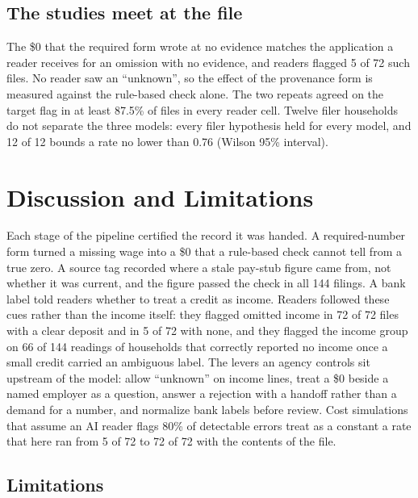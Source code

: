 \documentclass[sigconf,nonacm,screen]{acmart}
\begin{document}
\subsection{The studies meet at the file}
\label{sec:results-join}
The \$0 that the required form wrote at no evidence matches the application a reader receives for an omission with no evidence, and readers flagged 5 of 72 such files. No reader saw an ``unknown'', so the effect of the provenance form is measured against the rule-based check alone. The two repeats agreed on the target flag in at least 87.5\% of files in every reader cell. Twelve filer households do not separate the three models: every filer hypothesis held for every model, and 12 of 12 bounds a rate no lower than 0.76 (Wilson 95\% interval).

\section{Discussion and Limitations}
\label{sec:discussion}

Each stage of the pipeline certified the record it was handed. A required-number form turned a missing wage into a \$0 that a rule-based check cannot tell from a true zero. A source tag recorded where a stale pay-stub figure came from, not whether it was current, and the figure passed the check in all 144 filings. A bank label told readers whether to treat a credit as income. Readers followed these cues rather than the income itself: they flagged omitted income in 72 of 72 files with a clear deposit and in 5 of 72 with none, and they flagged the income group on 66 of 144 readings of households that correctly reported no income once a small credit carried an ambiguous label. The levers an agency controls sit upstream of the model: allow ``unknown'' on income lines, treat a \$0 beside a named employer as a question, answer a rejection with a handoff rather than a demand for a number, and normalize bank labels before review. Cost simulations that assume an AI reader flags 80\% of detectable errors treat as a constant a rate that here ran from 5 of 72 to 72 of 72 with the contents of the file.

\subsection{Limitations}
\end{document}
